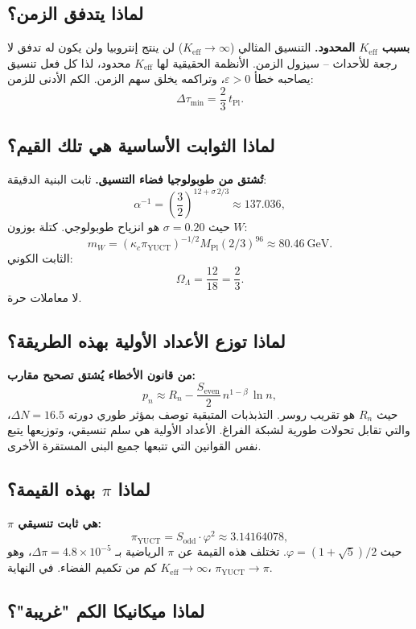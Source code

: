 \documentclass[12pt,a4paper]{article}
\newcommand{\Keff}{K_{\mathrm{eff}}}
\newcommand{\kappac}{\kappa_c}
\newcommand{\eps}{\varepsilon}
\newcommand{\betaf}{\beta}
\newcommand{\Sodd}{S_{\mathrm{odd}}}
\newcommand{\Seven}{S_{\mathrm{even}}}
\newcommand{\tPl}{t_{\mathrm{Pl}}}
\newcommand{\piYUCT}{\pi_{\mathrm{YUCT}}}
\begin{document}
	\subsection{لماذا يتدفق الزمن؟}
	
	\textbf{بسبب \(\Keff\) المحدود.} التنسيق المثالي (\(\Keff \to \infty\)) لن ينتج إنتروبيا ولن يكون له تدفق لا رجعة للأحداث – سيزول الزمن. الأنظمة الحقيقية لها \(\Keff\) محدود، لذا كل فعل تنسيق يصاحبه خطأ \(\eps > 0\)، وتراكمه يخلق سهم الزمن. الكم الأدنى للزمن:
	\[
	\Delta \tau_{\min} = \frac{2}{3}\,\tPl.
	\]
	
	\subsection{لماذا الثوابت الأساسية هي تلك القيم؟}
	
	\textbf{تُشتق من طوبولوجيا فضاء التنسيق.} ثابت البنية الدقيقة:
	\[
	\alpha^{-1} = \left(\frac{3}{2}\right)^{12 + \sigma\,2/3} \approx 137.036,
	\]
	حيث \(\sigma = 0.20\) هو انزياح طوبولوجي. كتلة بوزون \(W\):
	\[
	m_W = (\kappac \piYUCT)^{-1/2} M_{\mathrm{Pl}} (2/3)^{96} \approx 80.46\ \text{GeV}.
	\]
	الثابت الكوني:
	\[
	\Omega_\Lambda = \frac{12}{18} = \frac{2}{3}.
	\]
	لا معاملات حرة.
	
	\subsection{لماذا توزع الأعداد الأولية بهذه الطريقة؟}
	
	\textbf{من قانون الأخطاء يُشتق تصحيح مقارب:}
	\[
	p_n \approx R_n - \frac{\Seven}{2}\, n^{1-\betaf}\,\ln n,
	\]
	حيث \(R_n\) هو تقريب روسر. التذبذبات المتبقية توصف بمؤثر طوري دورته \(\Delta N = 16.5\)، والتي تقابل تحولات طورية لشبكة الفراغ. الأعداد الأولية هي سلم تنسيقي، وتوزيعها يتبع نفس القوانين التي تتبعها جميع البنى المستقرة الأخرى.
	
	\subsection{لماذا \(\pi\) بهذه القيمة؟}
	
	\textbf{\(\pi\) هي ثابت تنسيقي:}
	\[
	\piYUCT = \Sodd \cdot \varphi^2 \approx 3.14164078,
	\]
	حيث \(\varphi = (1+\sqrt{5})/2\). تختلف هذه القيمة عن \(\pi\) الرياضية بـ \(\Delta\pi = 4.8\times10^{-5}\)، وهو كم من تكميم الفضاء. في النهاية \(\Keff \to \infty\)، \(\piYUCT \to \pi\).
	
	\subsection{لماذا ميكانيكا الكم "غريبة"؟}
	
\end{document}
